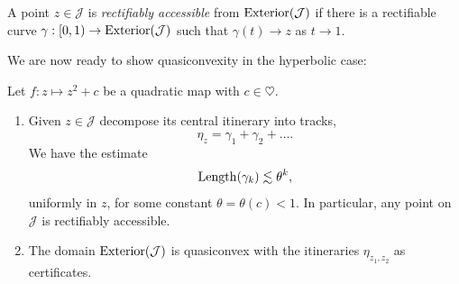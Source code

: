 \begin{definition}
	A point $z \in \mathcal J$ is \emph{rectifiably accessible} from $\operatorname{Exterior}(\mathcal J)$ if there is a rectifiable curve $\gamma: [0,1) \to \operatorname{Exterior}(\mathcal J)$ such that $\gamma (t) \to z$ as $t \to 1$.
\end{definition}

We are now ready to show quasiconvexity in the hyperbolic case:

\begin{theorem}  Let $f:z \mapsto z^2+c$ be a quadratic map with $c \in \heartsuit$. \leavevmode
\begin{enumerate}[label=\normalfont(\roman*)]

\item Given $z\in\mathcal{J}$ decompose its central itinerary into tracks, 
\begin{equation*}
\eta_z = \gamma _1 +\gamma_2 +\dots.
\end{equation*}
We have the estimate
\begin{equation*}
\operatorname{Length}(\gamma_{k})\lesssim\theta^{k},
\end{equation*}
uniformly in $z$, for some constant $\theta=\theta(c)<1$. 
In particular, any point on \(\mathcal{J}\) is rectifiably accessible.

\item The domain $\operatorname{Exterior}(\mathcal{J})$ is quasiconvex with the itineraries $\eta_{z_1,z_2}$ as certificates.
	\end{enumerate}
\end{theorem}

